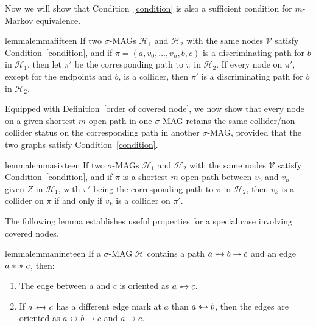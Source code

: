 \documentclass[accepted]{uai2025} %
\newcommand{\tuh}{\mathrel{\rightarrow}}
\newcommand{\huh}{\mathrel{\leftrightarrow}}
\newcommand{\suh}{\mathrel{{\ast\mkern-11mu\to}}}
\newcommand{\sus}{\mathrel{{\ast\mkern-11mu\relbar\mkern-9mu\relbar\mkern-11mu\ast}}}
\begin{document}
Now we will show that Condition~\ref{condition} is also a sufficient condition for $m$-Markov equivalence.

\begin{restatable}{lemma}{lemmafifteen} \label{lemma15}  
If two \( \sigma \)-MAGs \( \mathcal{H}_1 \) and \( \mathcal{H}_2 \) with the same nodes $\mathcal{V}$ satisfy Condition~\ref{condition}, and if \( \pi=(a,v_0,\ldots,v_n,b,c) \) is a discriminating path for $b$ in \( \mathcal{H}_1 \), then let \( \pi' \) be the corresponding path to \( \pi \) in \( \mathcal{H}_2 \). If every node on \( \pi' \), except for the endpoints and \( b \), is a collider, then \( \pi' \) is a discriminating path for \( b \) in \( \mathcal{H}_2 \). 
\end{restatable}

Equipped with Definition~\ref{order of covered node}, we now show that every node on a given shortest \( m \)-open path in one \( \sigma \)-MAG retains the same collider/non-collider status on the corresponding path in another \( \sigma \)-MAG, provided that the two graphs satisfy Condition~\ref{condition}.

\begin{restatable}{lemma}{lemmasixteen} \label{lemma16}  
If two \( \sigma \)-MAGs \( \mathcal{H}_1 \) and \( \mathcal{H}_2 \) with the same nodes \( \mathcal{V} \) satisfy Condition~\ref{condition}, and if \( \pi \) is a shortest $m$-open path between \( v_0 \) and \( v_n \) given \( Z \) in \( \mathcal{H}_1 \), with \( \pi' \) being the corresponding path to \( \pi \) in \( \mathcal{H}_2 \), then \( v_k \) is a collider on \( \pi \) if and only if \( v_k \) is a collider on \( \pi' \).  
\end{restatable}

The following lemma establishes useful properties for a special case involving covered nodes.

\begin{restatable}{lemma}{lemmanineteen} \label{lemma19}  
If a \( \sigma \)-MAG \( \mathcal{H} \) contains a path \( a \suh b\tuh c \) and an edge \( a \sus c \), then:  
\begin{enumerate}  
    \item The edge between $a$ and $c$ is oriented as \( a \suh c \).  
    \item If \( a \sus c \) has a different edge mark at \( a \) than \( a \suh b \), then the edges are oriented as \( a \huh b\tuh c \) and \( a \tuh c \).  
\end{enumerate}  
\end{restatable}
\end{document}

